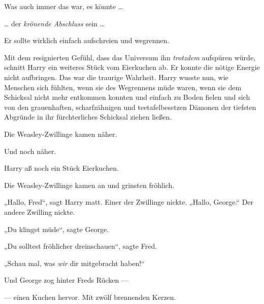 Was auch immer das war, es könnte …

… der \emph{krönende Abschluss} sein …

Er sollte wirklich einfach aufschreien und wegrennen.

Mit dem resignierten Gefühl, dass das Universum ihn \emph{trotzdem} aufspüren würde, schnitt Harry ein weiteres Stück vom Eierkuchen ab. Er konnte die nötige Energie nicht aufbringen. Das war die traurige Wahrheit. Harry wusste nun, wie Menschen sich fühlten, wenn sie des Wegrennens müde waren, wenn sie dem Schicksal nicht mehr entkommen konnten und einfach zu Boden fielen und sich von den grauenhaften, scharfzähnigen und teetafelbesetzen Dämonen der tiefsten Abgründe in ihr fürchterliches Schicksal ziehen ließen.

Die Weasley-Zwillinge kamen näher.

Und noch näher.

Harry aß noch ein Stück Eierkuchen.

Die Weasley-Zwillinge kamen an und grinsten fröhlich.

„Hallo, Fred“, sagt Harry matt. Einer der Zwillinge nickte.
„Hallo, George.“ Der andere Zwilling nickte.

„Du klingst müde“, sagte George.

„Du solltest fröhlicher dreinschauen“, sagte Fred.

„Schau mal, was \emph{wir} dir mitgebracht haben!“

Und George zog hinter Freds Rücken —

— einen Kuchen hervor. Mit zwölf brennenden Kerzen.

